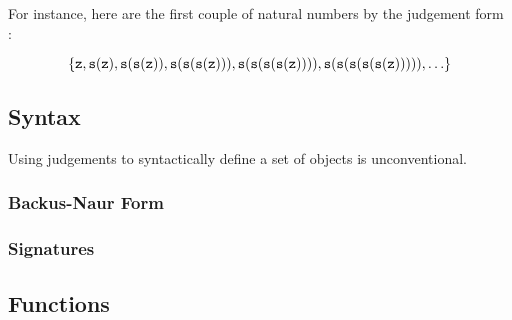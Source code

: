 For instance, here are the first couple of natural numbers by the judgement
form :

$$\left\{{\mathtt{z}, \mathtt{s}(\mathtt{z}), \mathtt{s}(\mathtt{s}(\mathtt{z})),
\mathtt{s}(\mathtt{s}(\mathtt{s}(\mathtt{z}))),
\mathtt{s}(\mathtt{s}(\mathtt{s}(\mathtt{s}(\mathtt{z})))),
\mathtt{s}(\mathtt{s}(\mathtt{s}(\mathtt{s}(\mathtt{s}(\mathtt{z}))))), \ldots }\right\}$$

\subsection{Syntax}

Using judgements to syntactically define a set of objects is unconventional.

\subsubsection{Backus-Naur Form}

\subsubsection{Signatures}

\subsection{Functions}







\pagebreak

%

%


%
